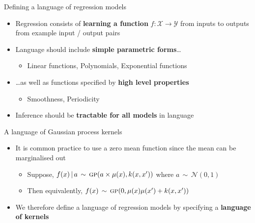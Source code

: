 \begin{frame}{Defining a language of regression models}
  \begin{itemize}
    \item Regression consists of {\bf learning a function} $f: \mathcal{X} \to \mathcal{Y}$ from inputs to outputs from example input / output pairs
    \vspace{\baselineskip}
    \item Language should include {\bf simple parametric forms}\ldots
    \begin{itemize}
       \item \eg Linear functions, Polynomials, Exponential functions
     \end{itemize}
    \vspace{\baselineskip}
    \item \ldots as well as functions specified by {\bf high level properties}
    \begin{itemize}
       \item \eg Smoothness, Periodicity
     \end{itemize}
    \vspace{\baselineskip}
    \item Inference should be {\bf tractable for all models} in language
  \end{itemize}
\end{frame}

\begin{frame}{A language of Gaussian process kernels}
  \begin{itemize}
    \item It is common practice to use a zero mean function since the mean can be marginalised out
  \begin{itemize}
    \item Suppose, ${f(x) \,|\, a \,\sim\, {\textsc{gp}}{}(a \times \mu(x), k(x,x'))}$ where $a \,\sim\, \mathcal{N}(0,1)$
    \item Then equivalently, $f(x) \,\sim\, {\textsc{gp}}{}(0, \mu(x)\mu(x') + k(x,x'))$
  \end{itemize}
  \vspace{\baselineskip}
  \item We therefore define a language of \gp{} regression models by
specifying a {\bf language of kernels}
  \end{itemize}
\end{frame}

